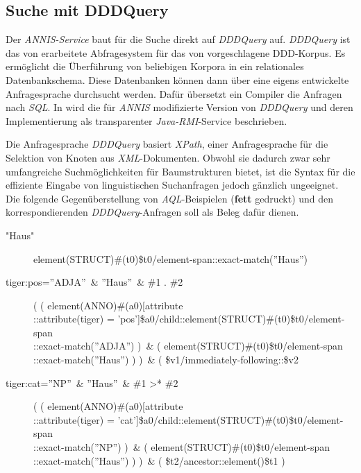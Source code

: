 \subsection{Suche mit DDDQuery}\label{sec:DDDQuery}

Der \emph{ANNIS-Service} baut für die Suche direkt auf \emph{DDDQuery} auf. \emph{DDDQuery} ist das von \cite{vitt2005dddquery} erarbeitete Abfragesystem für das von \cite{dipper2004ddd} vorgeschlagene DDD-Korpus. Es ermöglicht die Überführung von beliebigen Korpora in ein relationales Datenbankschema. Diese Datenbanken können dann über eine eigens entwickelte Anfragesprache durchsucht werden. Dafür übersetzt ein Compiler die Anfragen nach \emph{SQL}. In \cite{rosenfeldXXXX} wird die für \emph{ANNIS} modifizierte Version von \emph{DDDQuery} und deren Implementierung als transparenter \emph{Java-RMI}-Service beschrieben.

Die Anfragesprache \emph{DDDQuery} basiert \emph{XPath}, einer Anfragesprache für die Selektion von Knoten aus \emph{XML}-Dokumenten. Obwohl sie dadurch zwar sehr umfangreiche Suchmöglichkeiten für Baumstrukturen bietet, ist die Syntax für die effiziente Eingabe von linguistischen Suchanfragen jedoch gänzlich ungeeignet. Die folgende Gegenüberstellung von \emph{AQL}-Beispielen (\textbf{fett} gedruckt) und den korrespondierenden \emph{DDDQuery}-Anfragen soll als Beleg dafür dienen.

\begin{description}
	\item["Haus"]{element(STRUCT)\#(t0)\$t0/element-span::exact-match(''Haus'')}
	\item[tiger:pos=''ADJA''\ \& ''Haus''\ \& \#1 . \#2]{( ( element(ANNO)\#(a0)[attribute\\ ::attribute(tiger) = 'pos']\$a0/child::element(STRUCT)\#(t0)\$t0/element-span\\ ::exact-match(''ADJA'') )\ \& ( element(STRUCT)\#(t0)\$t0/element-span\\ ::exact-match(''Haus'') ) )\ \& ( \$v1/immediately-following::\$v2 }
	\item[tiger:cat=''NP''\ \& ''Haus''\ \& \#1 >* \#2]{( ( element(ANNO)\#(a0)[attribute\\::attribute(tiger) = 'cat']\$a0/child::element(STRUCT)\#(t0)\$t0/element-span\\::exact-match(''NP'') )\ \& ( element(STRUCT)\#(t0)\$t0/element-span\\::exact-match(''Haus'') ) )\ \& ( \$t2/ancestor::element()\$t1 )}
\end{description}


